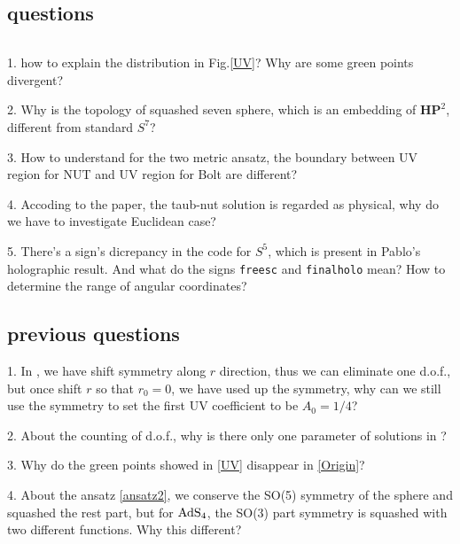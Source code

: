 \documentclass[12pt, a4paper]{article}
\numberwithin{equation}{section}
\begin{document}
\subsection{questions}
$ $

1. how to explain the distribution in Fig.\ref{UV}? Why are some green points divergent?

2. Why is the topology of squashed seven sphere, which is an embedding of $\textbf{HP}^2$, different from standard $S^7$?

3. How to understand for the two metric ansatz, the boundary between UV region for NUT and UV region for Bolt are different?  

4. Accoding to the paper, the taub-nut solution is regarded as physical, why do we have to investigate Euclidean case?

5. There's a sign's dicrepancy in the code for $S^5$, which is present in Pablo's holographic result\cite{Bueno:2018pf}. And what do the signs \texttt{freesc} and \texttt{finalholo} mean? How to determine the range of angular coordinates?

\subsection{previous questions}
1. In \cite{Bobev:2016sh}, we have shift symmetry along $r$ direction, thus we can eliminate one d.o.f., but once shift $r$ so that $r_0 = 0$, we have used up the symmetry, why can we still use the symmetry to set the first UV coefficient to be $A_0 = 1/4$?

2. About the counting of d.o.f., why is there only one parameter of solutions in \cite{Bobev:2016sh}?


3. Why do the green points showed in \ref{UV} disappear in \ref{Origin}?

4. About the ansatz \ref{ansatz2}, we conserve the SO(5) symmetry of the sphere and squashed the rest part, but for ${\rm AdS_4}$, the SO(3) part symmetry is squashed with two different functions. Why this different?
\end{document}
